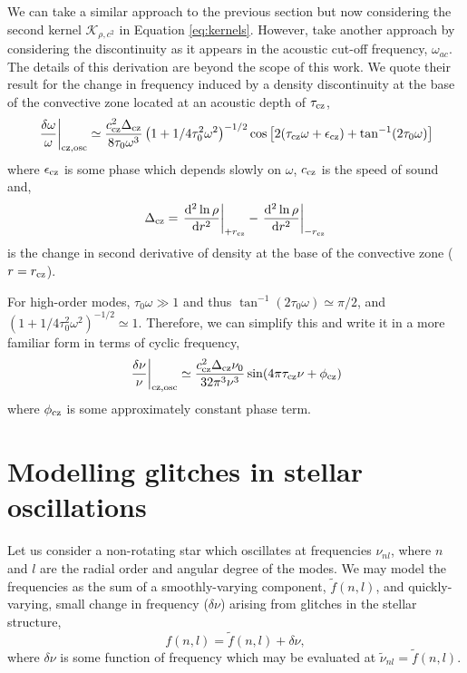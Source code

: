 We can take a similar approach to the previous section but now considering the second kernel \(\mathcal{K}_{\rho,c^2}\) in Equation \ref{eq:kernels}. However, \citet{Houdek.Gough2007} take another approach by considering the discontinuity as it appears in the acoustic cut-off frequency, \(\omega_{ac}\). The details of this derivation are beyond the scope of this work. We quote their result for the change in frequency induced by a density discontinuity at the base of the convective zone located at an acoustic depth of \(\tau_{{\mathrm{cz}}}\),
%
\begin{equation}
    \left.\frac{\delta\omega}{\omega}\right|_{{\mathrm{cz}},\mathrm{osc}} \simeq \frac{c_{{\mathrm{cz}}}^2\Delta_{{\mathrm{cz}}}}{8\tau_0 \omega^3} \left(1 + {1}/{4\tau_0^2\omega^2}\right)^{-1/2} \cos\left[2(\tau_{{\mathrm{cz}}} \omega + \epsilon_{{\mathrm{cz}}}) + \tan^{-1}(2\tau_0\omega)\right]
\end{equation}
%
where \(\epsilon_{{\mathrm{cz}}}\) is some phase which depends slowly on \(\omega\), \(c_{{\mathrm{cz}}}\) is the speed of sound and,
%
\begin{equation}
    \Delta_{{\mathrm{cz}}} = \left.\frac{\mathrm{d}^2 \ln\rho}{\mathrm{d} r^2}\right|_{+r_{{\mathrm{cz}}}} - \left.\frac{\mathrm{d}^2 \ln\rho}{\mathrm{d} r^2}\right|_{-r_{{\mathrm{cz}}}}
\end{equation}
%
is the change in second derivative of density at the base of the convective zone (\(r = r_{{\mathrm{cz}}}\)).

For high-order modes, \(\tau_0 \omega \gg 1\) and thus \(\tan^{-1}(2\tau_0\omega) \simeq \pi/2\), and \((1 + {1}/{4\tau_0^2\omega^2})^{-1/2} \simeq 1\). Therefore, we can simplify this and write it in a more familiar form in terms of cyclic frequency,
%
\begin{equation}
    \left.\frac{\delta\nu}{\nu}\right|_{{\mathrm{cz}},\mathrm{osc}} \simeq \frac{c_{{\mathrm{cz}}}^2\Delta_{{\mathrm{cz}}}\nu_0}{32\pi^3 \nu^3} \sin(4\pi\tau_{{\mathrm{cz}}}\nu + \phi_{{\mathrm{cz}}}) \label{eq:bcz-osc}
\end{equation}
%
where \(\phi_{{\mathrm{cz}}}\) is some approximately constant phase term.

\section[Modelling the glitch]{Modelling glitches in stellar oscillations}

Let us consider a non-rotating star which oscillates at frequencies \(\nu_{nl}\), where \(n\) and \(l\) are the radial order and angular degree of the modes. We may model the frequencies as the sum of a smoothly-varying component, \(\tilde{f}(n, l)\), and quickly-varying, small change in frequency (\(\delta\nu\)) arising from glitches in the stellar structure,
%
\begin{equation}
    f(n, l) = \tilde{f}(n, l) + \delta\nu,\label{eq:general-glitch}
\end{equation}
%
where \(\delta\nu\) is some function of frequency which may be evaluated at \(\tilde{\nu}_{nl} = \tilde{f}(n, l)\).

